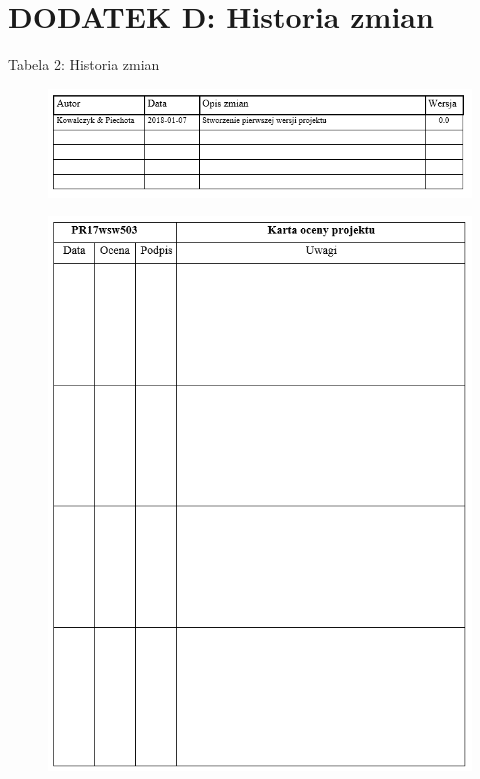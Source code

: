 \section{DODATEK D: Historia zmian}
\label{sub:dodatekD}

\begin{center}
Tabela 2: Historia zmian
\begin{figure}[H]
	\centering
	\includegraphics[scale=0.9]{obrazki/postep}
\end{figure}
\end{center}

\newpage

\begin{center}
\begin{figure}[H]
	\centering
	\includegraphics[scale=1]{obrazki/ocena}
\end{figure}
\end{center}